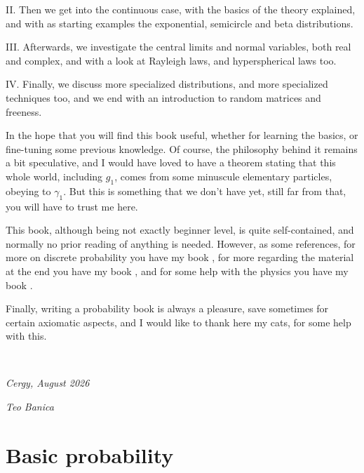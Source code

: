 \documentclass[12pt]{amsbook}
\begin{document}
\bigskip

II. Then we get into the continuous case, with the basics of the theory explained, and with as starting examples the exponential, semicircle and beta distributions.

\bigskip

III. Afterwards, we investigate the central limits and normal variables, both real and complex, and with a look at Rayleigh laws, and hyperspherical laws too.

\bigskip

IV. Finally, we discuss more specialized distributions, and more specialized techniques too, and we end with an introduction to random matrices and freeness.

\bigskip

In the hope that you will find this book useful, whether for learning the basics, or fine-tuning some previous knowledge. Of course, the philosophy behind it remains a bit speculative, and I would have loved to have a theorem stating that this whole world, including $g_1$, comes from some minuscule elementary particles, obeying to $\gamma_1$. But this is something that we don't have yet, still far from that, you will have to trust me here.

\bigskip

This book, although being not exactly beginner level, is quite self-contained, and normally no prior reading of anything is needed. However, as some references, for more on discrete probability you have my book \cite{ba1}, for more regarding the material at the end you have my book \cite{ba2}, and for some help with the physics you have my book \cite{ba3}.

\bigskip

Finally, writing a probability book is always a pleasure, save sometimes for certain axiomatic aspects, and I would like to thank here my cats, for some help with this.

\bigskip

\

{\em Cergy, August 2026}

\smallskip

{\em Teo Banica}

\baselineskip=15.95pt
\tableofcontents
\baselineskip=14pt

\part{Basic probability}

\ \vskip50mm
\end{document}
